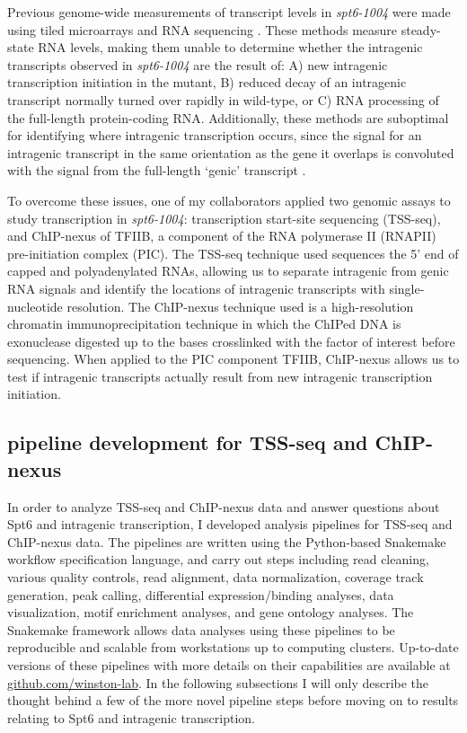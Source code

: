 \documentclass[11pt, a4paper]{article}
\begin{document}
Previous genome-wide measurements of transcript levels in \textit{spt6-1004} were made using tiled microarrays \cite{cheung2008} and RNA sequencing \cite{uwimana2017}. These methods measure steady-state RNA levels, making them unable to determine whether the intragenic transcripts observed in \textit{spt6-1004} are the result of: A) new intragenic transcription initiation in the mutant, B) reduced decay of an intragenic transcript normally turned over rapidly in wild-type, or C) RNA processing of the full-length protein-coding RNA. Additionally, these methods are suboptimal for identifying where intragenic transcription occurs, since the signal for an intragenic transcript in the same orientation as the gene it overlaps is convoluted with the signal from the full-length `genic' transcript \cite{cheung2008, lickwar2009}.

To overcome these issues, one of my collaborators applied two genomic assays to study transcription in \textit{spt6-1004}: transcription start-site sequencing (TSS-seq), and ChIP-nexus of TFIIB, a component of the RNA polymerase II (RNAPII) pre-initiation complex (PIC). The TSS-seq technique used sequences the 5' end of capped and polyadenylated RNAs, allowing us to separate intragenic from genic RNA signals and identify the locations of intragenic transcripts with single-nucleotide resolution. The ChIP-nexus technique used is a high-resolution chromatin immunoprecipitation technique in which the ChIPed DNA is exonuclease digested up to the bases crosslinked with the factor of interest before sequencing. When applied to the PIC component TFIIB, ChIP-nexus allows us to test if intragenic transcripts actually result from new intragenic transcription initiation.

\subsection{pipeline development for TSS-seq and ChIP-nexus}

In order to analyze TSS-seq and ChIP-nexus data and answer questions about Spt6 and intragenic transcription, I developed analysis pipelines for TSS-seq and ChIP-nexus data. The pipelines are written using the Python-based Snakemake workflow specification language, and carry out steps including read cleaning, various quality controls, read alignment, data normalization, coverage track generation, peak calling, differential expression/binding analyses, data visualization, motif enrichment analyses, and gene ontology analyses. The Snakemake framework allows data analyses using these pipelines to be reproducible and scalable from workstations up to computing clusters. Up-to-date versions of these pipelines with more details on their capabilities are available at \href{https://github.com/winston-lab}{github.com/winston-lab}. In the following subsections I will only describe the thought behind a few of the more novel pipeline steps before moving on to results relating to Spt6 and intragenic transcription.
\end{document}
